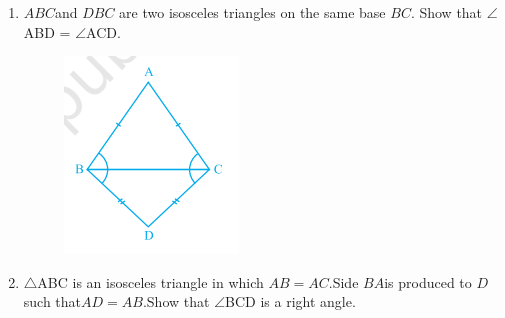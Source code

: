 \documentclass[12pt]{article}
\begin{document}
\begin{enumerate}
\begin{figure}[!h]
\end{figure}
\item $ABC$and $DBC$ are two isosceles triangles on the same base $BC$. Show that
$\angle$ABD = $\angle$ACD.
\begin{figure}[!h]
\begin{center}
\includegraphics[width=\columnwidth]{./figs/triangle6.png}
\end{center}                                      \caption{}                                        \label{fig:Fig1}                                  \end{figure}
\item$\triangle$ABC is an isosceles triangle in which $AB = AC$.Side $BA $is produced to $D$ such that$ AD = AB$.Show that $\angle$BCD is a right angle.
	\begin{figure}[!h]
\begin{center}

\end{center}
\end{figure}
\end{enumerate}
\end{document}
